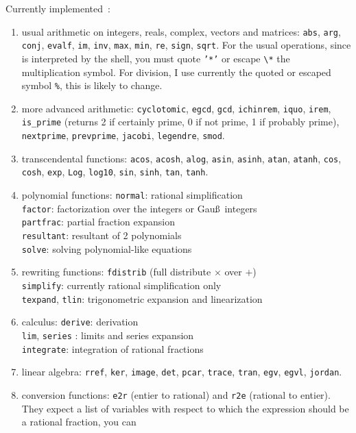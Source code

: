 \documentclass{article}
\begin{document}
Currently implemented~:
\begin{enumerate}
\item usual arithmetic on integers, reals, complex, vectors and matrices:
{\tt abs},  {\tt arg},  {\tt conj},
{\tt evalf},  {\tt im}, {\tt inv},  {\tt max}, {\tt min}, 
{\tt re}, {\tt sign},  {\tt sqrt}.
For the usual operations, since {\tt *} is interpreted by the shell, 
you must quote {\tt '*'} or escape \verb|\*| the multiplication symbol. 
For division, I use currently the quoted or escaped symbol {\tt \%}, this
is likely to change.
\item more advanced arithmetic: {\tt cyclotomic}, {\tt egcd}, {\tt gcd}, 
{\tt ichinrem}, {\tt iquo}, {\tt irem}, \verb|is_prime| (returns 2 if
certainly prime, 0 if not prime, 1 if probably prime), 
{\tt nextprime}, {\tt prevprime}, {\tt jacobi}, {\tt legendre}, {\tt smod}.
\item transcendental functions: {\tt acos}, {\tt acosh}, {\tt alog},  
{\tt asin}, {\tt asinh}, {\tt atan}, {\tt atanh}, 
{\tt cos}, {\tt cosh}, {\tt exp}, {\tt Log}, {\tt log10},  
{\tt sin}, {\tt sinh}, {\tt tan}, {\tt tanh}. 
\item polynomial functions: {\tt normal}: rational simplification \\
{\tt factor}: factorization over the integers or Gau\ss\ integers\\
{\tt partfrac}: partial fraction expansion \\
{\tt resultant}: resultant of 2 polynomials \\
{\tt solve}: solving polynomial-like equations
\item rewriting functions: {\tt fdistrib} (full distribute $\times$ over $+$)\\
 {\tt simplify}: currently rational simplification only \\
{\tt texpand}, {\tt tlin}: trigonometric expansion and linearization
\item calculus: {\tt derive}: derivation\\
{\tt lim}, {\tt series} : limits and series expansion \\
{\tt integrate}: integration of rational fractions
\item linear algebra: {\tt rref}, {\tt ker}, {\tt image}, {\tt det}, 
{\tt pcar}, {\tt trace}, {\tt tran}, {\tt egv}, {\tt egvl}, 
{\tt jordan}.
\item conversion functions: {\tt e2r} (entier to rational) and
{\tt r2e} (rational to entier). They expect a list of variables with
respect to which the expression should be a rational fraction, you can

\end{enumerate}
\end{document}
